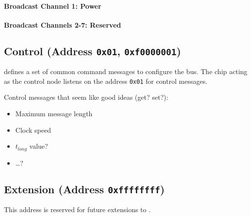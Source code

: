 \paragraph{Broadcast Channel 1: Power}
\label{sec:channel-1}

\paragraph{Broadcast Channels 2-7: Reserved}
\label{sec:channel-2-7}

\subsection{Control (Address \texttt{0x01}, \texttt{0xf0000001})}
\label{sec:control-control}
\bus defines a set of common command messages to configure the bus. The chip
acting as the control node listens on the address {\tt 0x01} for \bus control
messages.

Control messages that seem like good ideas (get? set?):
\begin{itemize}
  \item Maximum message length
  \item Clock speed
  \item $t_{long}$ value?
  \item \ldots?
\end{itemize}

\subsection{Extension (Address \texttt{0xffffffff})}
This address is reserved for future extensions to \bus.

